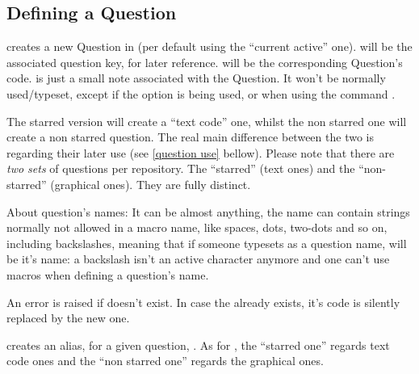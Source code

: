 \documentclass[10pt]{article}
\begin{document}
\subsection{Defining a Question}\label{question definition}
\begin{codedescribe}{}
\begin{codesyntax}%
\end{codesyntax}
 creates a new Question in  (per default using the ``current active'' one).  will be the associated question key, for later reference.  will be the corresponding Question's code.  is just a small note associated with the Question. It won't be normally used/typeset, except if the  option is being used, or when using the command \tsobj{\QuestionsList}.

The starred version  will create a ``text code'' one, whilst the non starred one  will create a non starred question. The real main difference between the two is regarding their later use (see \ref{question use}  bellow). Please note that there are \emph{two sets} of questions per repository. The ``starred'' (text ones) and the ``non-starred'' (graphical ones). They are fully distinct.
\end{codedescribe}

\begin{tsremark}
About question's names: It can be almost anything, the name can contain strings normally not allowed in a macro name, like spaces, dots, two-dots and so on, including backslashes, meaning that if someone typesets \tsobj{\XYZ} as a question name, \tsobj{\XYZ} will be it's name: a backslash isn't an active character anymore and one can't use macros when defining a question's name.
\end{tsremark}

\begin{tsremark}
An error is raised if  doesn't exist. In case the  already exists, it's code is silently replaced by the new one.
\end{tsremark}


\begin{codedescribe}{}
\begin{codesyntax}%
\end{codesyntax}
 creates an alias,  for a given question, . As for , the ``starred one'' regards text code ones and the ``non starred one'' regards the graphical ones.
\end{codedescribe}
\end{document}
